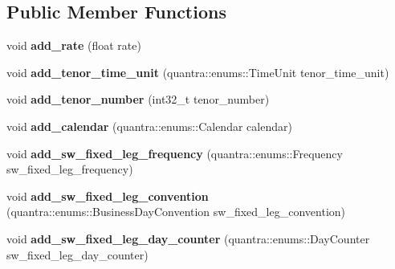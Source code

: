 \subsection*{Public Member Functions}
\begin{DoxyCompactItemize}
\item 
\mbox{\label{structquantra_1_1SwapHelperBuilder_a8219d14f3464ba8e7126a8cde4f802cc}} 
void {\bfseries add\+\_\+rate} (float rate)
\item 
\mbox{\label{structquantra_1_1SwapHelperBuilder_a5078b45fe7267f1e7788119391bc0140}} 
void {\bfseries add\+\_\+tenor\+\_\+time\+\_\+unit} (quantra\+::enums\+::\+Time\+Unit tenor\+\_\+time\+\_\+unit)
\item 
\mbox{\label{structquantra_1_1SwapHelperBuilder_a025791a9c82fae6dc8f005784fbd83f9}} 
void {\bfseries add\+\_\+tenor\+\_\+number} (int32\+\_\+t tenor\+\_\+number)
\item 
\mbox{\label{structquantra_1_1SwapHelperBuilder_a6f76e44fe80593c55ab6e94eb0bfcde9}} 
void {\bfseries add\+\_\+calendar} (quantra\+::enums\+::\+Calendar calendar)
\item 
\mbox{\label{structquantra_1_1SwapHelperBuilder_a5f94722d5a31157c8bacbaaa02eb55ea}} 
void {\bfseries add\+\_\+sw\+\_\+fixed\+\_\+leg\+\_\+frequency} (quantra\+::enums\+::\+Frequency sw\+\_\+fixed\+\_\+leg\+\_\+frequency)
\item 
\mbox{\label{structquantra_1_1SwapHelperBuilder_a4bab5b33e4c6af749b3249c1d6a941f2}} 
void {\bfseries add\+\_\+sw\+\_\+fixed\+\_\+leg\+\_\+convention} (quantra\+::enums\+::\+Business\+Day\+Convention sw\+\_\+fixed\+\_\+leg\+\_\+convention)
\item 
\mbox{\label{structquantra_1_1SwapHelperBuilder_a99aece1361e30a7bb9ab5dab0696ac93}} 
void {\bfseries add\+\_\+sw\+\_\+fixed\+\_\+leg\+\_\+day\+\_\+counter} (quantra\+::enums\+::\+Day\+Counter sw\+\_\+fixed\+\_\+leg\+\_\+day\+\_\+counter)
\item 
\mbox{\label{structquantra_1_1SwapHelperBuilder_a2bb164d567d8d9a9a47d83a051b66550}} 

\end{DoxyCompactItemize}
